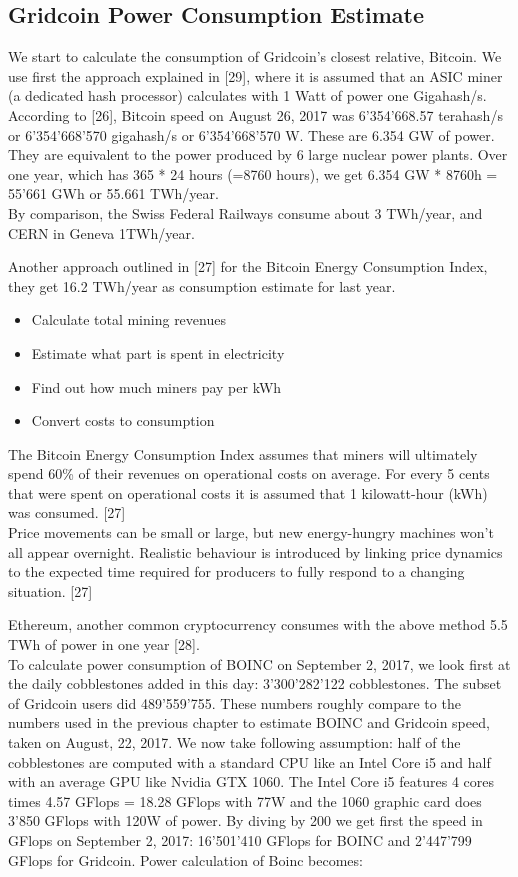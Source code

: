 \subsection{Gridcoin Power Consumption Estimate}

We start to calculate the consumption of Gridcoin's closest relative, Bitcoin. 
We use first the approach explained in [29], where it is assumed that an ASIC miner (a dedicated hash processor) calculates with 1 Watt of power one Gigahash/s. According to [26], Bitcoin speed on August 26, 2017 was 6'354'668.57 terahash/s or 6'354'668'570 gigahash/s or 6'354'668'570 W. These are 6.354 GW of power. They are equivalent to the power produced by 6 large nuclear power plants. Over one year, which has 365 * 24 hours (=8760 hours), we get 6.354 GW * 8760h = 55'661 GWh or 55.661 TWh/year.\\ 

By comparison, the Swiss Federal Railways consume about 3 TWh/year, and CERN in Geneva 1TWh/year.

Another approach outlined in [27] for the Bitcoin Energy Consumption Index, they get 16.2 TWh/year as consumption estimate for last year.

\begin{itemize}
	\item Calculate total mining revenues
	\item Estimate what part is spent in electricity
	\item Find out how much miners pay per kWh
	\item Convert costs to consumption
\end{itemize}

The Bitcoin Energy Consumption Index assumes that miners will ultimately spend 60\% of their revenues on operational costs on average. For every 5 cents that were spent on operational costs it is assumed that 1 kilowatt-hour (kWh) was consumed. [27]\\

Price movements can be small or large, but new energy-hungry machines won't all appear overnight. Realistic behaviour is introduced by linking price dynamics to the expected time required for producers to fully respond to a changing situation. [27]

Ethereum, another common cryptocurrency consumes with the above method 5.5 TWh of power in one year [28].\\

To calculate power consumption of BOINC on September 2, 2017, we look first at the daily cobblestones added in this day: 3'300'282'122 cobblestones. The subset of Gridcoin users did 489'559'755. These numbers roughly compare to the numbers used in the previous chapter to estimate BOINC and Gridcoin speed, taken on August, 22, 2017. We now take following assumption: half of the cobblestones are computed with a standard CPU like an Intel Core i5 and half with an average GPU like Nvidia GTX 1060. The Intel Core i5 features 4 cores times 4.57 GFlops = 18.28 GFlops with 77W and the 1060 graphic card does 3'850 GFlops with 120W of power. By diving by 200 we get first the speed in GFlops on September 2, 2017: 16'501'410 GFlops for BOINC and 2'447'799 GFlops for Gridcoin. Power calculation of Boinc becomes:


